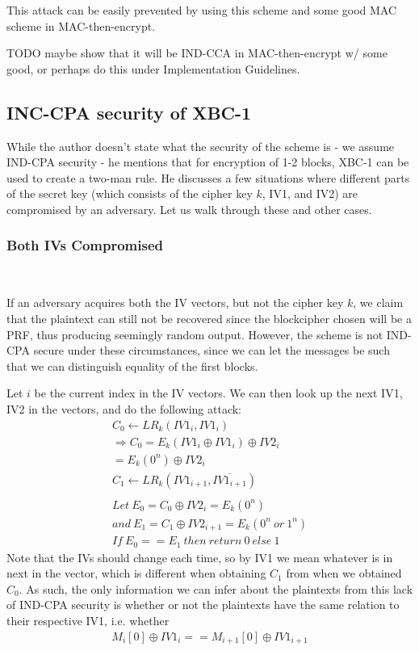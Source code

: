 \documentclass[conference]{IEEEtran}
\begin{document}
This attack can be easily prevented by using this scheme and some good MAC scheme in MAC-then-encrypt.

{\color{red}
TODO maybe show that it will be IND-CCA in MAC-then-encrypt w/ some good, or perhaps do this under Implementation Guidelines.
}

\subsection{INC-CPA security of XBC-1}

While the author doesn't state what the security of the scheme is  - we assume IND-CPA security - he mentions that for encryption of 1-2 blocks, XBC-1 can be used to create a two-man rule. He discusses a few situations where different parts of the secret key (which consists of the cipher key $k$, IV1, and IV2) are compromised by an adversary. Let us walk through these and other cases. \\

\subsubsection{Both IVs Compromised} \

If an adversary acquires both the IV vectors, but not the cipher key $k$, we claim that the plaintext can still not be recovered since the blockcipher chosen will be a PRF, thus producing seemingly random output. However, the scheme is not IND-CPA secure under these circumstances, since we can let the messages be such that we can distinguish equality of the first blocks.

Let $i$ be the current index in the IV vectors. We can then look up the next IV1, IV2 in the vectors, and do the following attack:
\begin{gather*}
  C_0 \leftarrow LR_k(IV1_i, IV1_i) \\
  \Rightarrow C_0=E_k(IV1_i \oplus IV1_i) \oplus IV2_i \\
  = E_k(0^n) \oplus IV2_i \\
  C_1 \leftarrow LR_k(IV1_{i+1}, \overline{IV1_{i+1}}) \\ \\
  Let\ E_0=C_0 \oplus IV2_i=E_k(0^n) \\
  and\ E_1=C_1 \oplus IV2_{i+1}=E_k(0^n\ or\ 1^n) \\
  If\ E_0==E_1\ then\ return\ 0\ else\ 1
\end{gather*}
Note that the IVs should change each time, so by IV1 we mean whatever is in next in the vector, which is different when obtaining $C_1$ from when we obtained $C_0$. As such, the only information we can infer about the plaintexts from this lack of IND-CPA security is whether or not the plaintexts have the same relation to their respective IV1, i.e. whether
\begin{gather*}
  M_i[0] \oplus IV1_i == M_{i+1}[0] \oplus IV1_{i+1}
\end{gather*}
\end{document}
